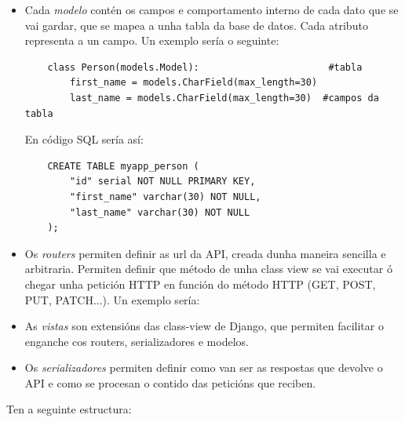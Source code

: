 \documentclass[11pt,twoside]{book}
\begin{document}
\begin{itemize}
    \item Cada \textit{modelo} contén os campos e comportamento interno de cada dato que se vai gardar, que se mapea a unha tabla da base de datos. Cada atributo representa a un campo. Un exemplo sería o seguinte:
    
    \begin{verbatim}
    class Person(models.Model):                       #tabla
        first_name = models.CharField(max_length=30) 
        last_name = models.CharField(max_length=30)  #campos da tabla
    \end{verbatim}
    
    En código SQL sería así:
    
    \begin{verbatim}
    CREATE TABLE myapp_person (
        "id" serial NOT NULL PRIMARY KEY,
        "first_name" varchar(30) NOT NULL,
        "last_name" varchar(30) NOT NULL
    );
    \end{verbatim}
    
    \item Os \textit{routers} permiten definir as url da API, creada dunha maneira sencilla e arbitraria. Permiten definir que método de unha class view se vai executar ó chegar unha petición HTTP en función do método HTTP (GET, POST, PUT, PATCH...). Un exemplo sería:
    
    \item As \textit{vistas} son extensións das class-view de Django, que permiten facilitar o enganche cos routers, serializadores e modelos.
    
    \item Os \textit{serializadores} permiten definir como van ser as respostas que devolve o API e como se procesan o contido das peticións que reciben.
    
\end{itemize}

Ten a seguinte estructura:
\end{document}
